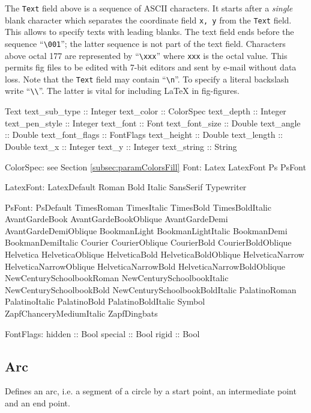 \documentclass[10pt, a4paper]{article}
\begin{document}
The {\tt Text} field above is a sequence of ASCII characters. 
It starts after a {\em single} blank character 
which separates the coordinate field {\tt x, y} from the {\tt Text} field. 
This allows to specify texts with leading blanks. 
The text field ends before the sequence ``{\tt\textbackslash 001}''; 
the latter sequence is not part of the text field. 
Characters above octal 177 are represented by ``{\tt\textbackslash xxx}'' 
where {\tt xxx} is the octal value. 
This permits fig files to be edited with 7-bit editors 
and sent by e-mail without data loss. 
Note that the {\tt Text} field may contain ``{\tt\textbackslash n}''. 
To specify a literal backslash write ``{\tt\textbackslash\textbackslash}''. 
The latter is vital for including \LaTeX{} in fig-figures. 


Text	 
text\_sub\_type :: Integer
text\_color :: ColorSpec
text\_depth :: Integer
text\_pen\_style :: Integer
text\_font :: Font
text\_font\_size :: Double
text\_angle :: Double
text\_font\_flags :: FontFlags
text\_height :: Double
text\_length :: Double
text\_x :: Integer
text\_y :: Integer
text\_string :: String

ColorSpec: see Section \ref{subsec:paramColorsFill}
Font:
Latex LatexFont	 
Ps PsFont	 


LatexFont:
LatexDefault	 
Roman	 
Bold	 
Italic	 
SansSerif	 
Typewriter	 


PsFont:
PsDefault	 
TimesRoman	 
TimesItalic	 
TimesBold	 
TimesBoldItalic	 
AvantGardeBook	 
AvantGardeBookOblique	 
AvantGardeDemi	 
AvantGardeDemiOblique	 
BookmanLight	 
BookmanLightItalic	 
BookmanDemi	 
BookmanDemiItalic	 
Courier	 
CourierOblique	 
CourierBold	 
CourierBoldOblique	 
Helvetica	 
HelveticaOblique	 
HelveticaBold	 
HelveticaBoldOblique	 
HelveticaNarrow	 
HelveticaNarrowOblique	 
HelveticaNarrowBold	 
HelveticaNarrowBoldOblique	 
NewCenturySchoolbookRoman	 
NewCenturySchoolbookItalic	 
NewCenturySchoolbookBold	 
NewCenturySchoolbookBoldItalic	 
PalatinoRoman	 
PalatinoItalic	 
PalatinoBold	 
PalatinoBoldItalic	 
Symbol	 
ZapfChanceryMediumItalic	 
ZapfDingbats	 


FontFlags:
hidden :: Bool
special :: Bool
rigid :: Bool





\subsection{Arc}\label{subsec:arc}

Defines an arc, i.e. a segment of a circle by a start point, 
an intermediate point and an end point. 
\end{document}
